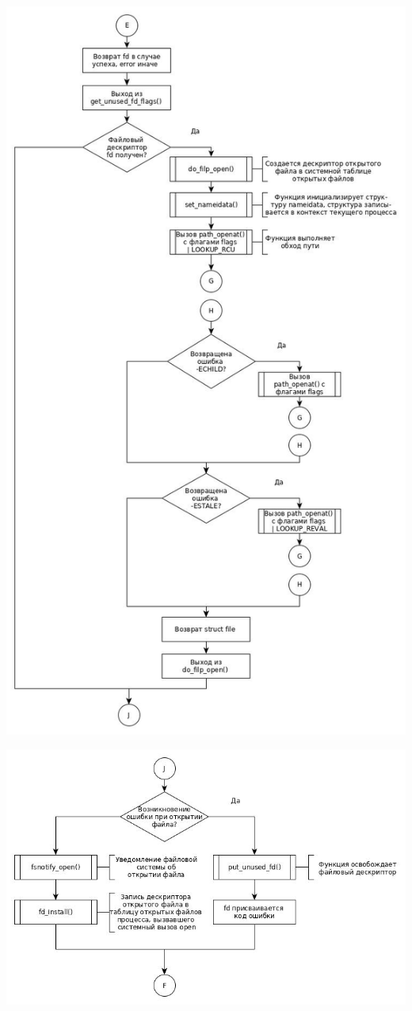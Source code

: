 \documentclass[a4paper,14pt]{extreport} %
\begin{document}
\newpage
\includegraphics[scale=0.57]{3.jpg}

\newpage
\includegraphics[scale=0.57]{4.jpg}
\end{document}
